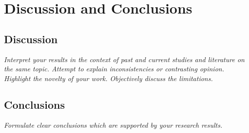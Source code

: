 %
%
%

\chapter{Discussion and Conclusions}

\section{Discussion}

\textit{Interpret your results in the context of past and current studies and literature on the same topic. Attempt to explain inconsistencies or contrasting opinion. Highlight the novelty of your work. Objectively discuss the limitations.}

\section{Conclusions}

\textit{Formulate clear conclusions which are supported by your research results.}

\endinput
